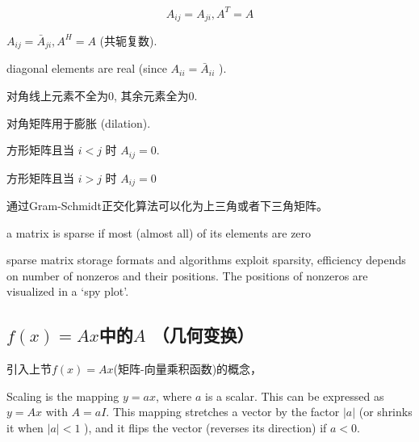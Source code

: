 \begin{definition}
    \begin{equation} A_{i j}=A_{j i}, A^T =A \end{equation}
\end{definition}

\begin{definition}
    $ A_{i j}=\bar{A}_{j i}, A^H = A $ (共轭复数).
\end{definition}

\begin{remark}
    diagonal elements are real (since $ A_{i i}=\bar{A}_{i i} $ ).
\end{remark}

\begin{definition}
    对角线上元素不全为0, 其余元素全为0.
\end{definition}

对角矩阵用于膨胀 (dilation).

\begin{definition}[下三角矩阵]
    方形矩阵且当 $ i<j $ 时 $ A_{i j}=0 $.
\end{definition}

\begin{definition}[上三角矩阵]
    方形矩阵且当 $ i>j $ 时 $ A_{i j}=0 $
\end{definition}

通过Gram-Schmidt正交化算法可以化为上三角或者下三角矩阵。

\begin{definition}
    a matrix is sparse if most (almost all) of its elements are zero
\end{definition}

sparse matrix storage formats and algorithms exploit sparsity, efficiency depends on number of nonzeros and their positions. The positions of nonzeros are visualized in a `spy plot'.

\subsection{$f(x)=A x$中的$A$ （几何变换）}

引入上节$f(x)=A x$(矩阵-向量乘积函数)的概念，

\begin{definition}[Scaling]
    Scaling is the mapping $ y=a x $, where $ a $ is a scalar. This can be expressed as $ y=A x $ with $ A=a I $. This mapping stretches a vector by the factor $ |a| $ (or shrinks it when $ |a|<1 $ ), and it flips the vector (reverses its direction) if $ a<0 $.
\end{definition}

